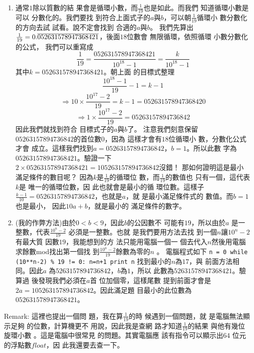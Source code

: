 \documentclass{article}
\begin{document}
\begin{enumerate}
\item 通常$1$除以質數的結%
果會是循環小數，而$%
\frac{1}{19}$也是如此。而我們%
知道循環小數是可以%
分數化的。我們要找%
到符合上面式子的$a$與$b
$，可以朝$\frac{1}{19}$循環小%
數分數化的方向去試%
試看。說不定會找到%
合適的$a$與$b$。\newline
我們先算出$\frac{1}{19}=0.\overline{%
052631578947368421}$，後面$18$位數會%
無限循環，依照循環%
小數分數化的公式，%
我們可以重寫成%
\[
\frac{1}{19}=\frac{052631578947368421}{10^{18}-1}=\frac{k}{10^{18}-1}
\]%
其中$k=052631578947368421$。朝上面%
的目標式整理%
\[
\frac{10^{18}-1}{19}-1=k-1
\]%
\[
\Rightarrow 10\times \frac{10^{17}-2}{19}=k-1=052631578947368420
\]%
\[
\Rightarrow 1\times \frac{10^{17}-2}{19}=05263157894736842
\]%
因此我們就找到符合%
目標式子的$a$與$b$了。%
注意我們刻意保留$%
05263157894736842$的首位數$0$，因為%
這樣才會有$18$位循環小%
數，分數化公式才會%
成立。這樣我們找到$%
a=05263157894736842$，$b=1$。所以此數%
字為$052631578947368421$。驗證一下$%
2\times 052631578947368421=105263157894736842$沒錯！%
\newline
那如何證明這是最小%
滿足條件的數目呢？%
因為$k$是$\frac{1}{19}$的循環位%
數，而$\frac{1}{19}$的數值也%
只有一個，這代表$k$是%
唯一的循環位數，因%
此也就會是最小的循%
環位數。這樣子$\frac{k-1}{10}%
=05263157894736842$，也就是$a$，就%
是最小滿足條件式的%
數值。而$b=1$也是最小，%
因此$10a+b$，就是最小的%
滿足條件的數字。

\item (我的作弊方法)由於$%
0<b<9$，因此$b$的公因數不%
可能有$19$，所以由於$a$%
是一整數，代表$\frac{10^{n}-2}{19}$%
必須是一整數。也就%
是我們要用方法去找%
到一個$n$讓$10^{n}-2$有最大質%
因數$19$，我能想到的方%
法只能用電腦一個一%
個去代入$n$然後用電腦%
求餘數mod找出第一個找%
到$\frac{10^{n}-2}{19}$餘數為零的$n$%
。\newline
電腦程式如下\newline
\texttt{n = 0\newline
while (10**n-2) \% 19 != 0:\newline
\quad n=n+1\newline
print n}\newline
找到最小的$n$為$17$，與%
前面方法相同。因此$a$%
為$5263157894736842$，$b$為$1$，所以%
此數為$52631578947368421$。驗算過%
後發現我們必須在$a$首%
位加個零，這樣尾數%
提到前面才會是$%
2a=105263157894736842$。因此滿足題%
目最小的此位數為$%
052631578947368421$。
\end{enumerate}

\bigskip

Remark: 這裡也提出一個問%
題，我在算$\frac{1}{19}$的時%
候遇到一個問題，就%
是電腦無法顯示足夠%
的位數，計算機更不%
用說，因此我是查網%
路才知道$\frac{1}{19}$的結果%
與他有幾位旋環小數%
。這是電腦中很常見%
的問題。其實電腦應%
該有指令可以顯示出$64$%
位元的浮點數$float$，因%
此我還要去查一下。
\end{document}
